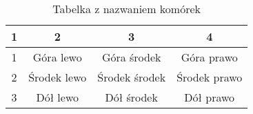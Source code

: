 \begin{table}[htbp]
\centering
\begin{tabular}{||c c c c||} 
 \hline
 1 & 2 & 3 & 4 \\ [0.5ex] 
 \hline\hline
 1 & Góra lewo & Góra środek & Góra prawo \\ 
 \hline
 2 & Środek lewo & Środek środek & Środek prawo \\
 \hline
 3 & Dół lewo & Dół środek & Dół prawo \\
 \hline


 \hline
\end{tabular}
\label{tab:12}
\caption{Tabelka z nazwaniem komórek}
\end{table}